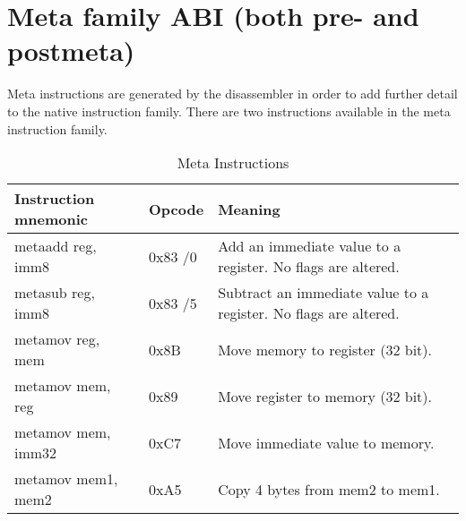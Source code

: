 \documentclass[12pt]{report}
\begin{document}
\section{Meta family ABI (both pre- and postmeta)}
\label{sec:meta-family-abi}
Meta instructions are generated by the disassembler in order to add further detail to the native instruction family. There are two instructions available in the meta instruction family.\\
\begin{table}[H]
	\begin{tabular}{| l | l | l |}
		\hline
		\textbf{Instruction mnemonic} & \textbf{Opcode} & \textbf{Meaning}\\ \hline
		metaadd reg, imm8 & 0x83 /0 & Add an immediate value to a register. No flags are altered.\\ \hline
		metasub reg, imm8 & 0x83 /5 & Subtract an immediate value to a register. No flags are altered.\\ \hline
		metamov reg, mem & 0x8B & Move memory to register (32 bit).\\ \hline
		metamov mem, reg & 0x89 & Move register to memory (32 bit).\\ \hline
		metamov mem, imm32 & 0xC7 & Move immediate value to memory.\\ \hline
		metamov mem1, mem2 & 0xA5 & Copy 4 bytes from mem2 to mem1.\\ \hline
	\end{tabular}
	\caption{Meta Instructions}
\end{table}
\end{document}

